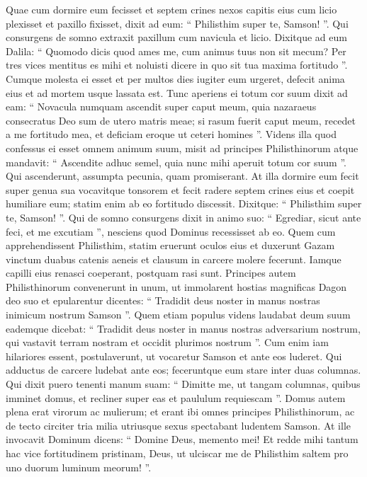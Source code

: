 \begin{biblechapter}
\begin{biblechapter}
\begin{biblechapter}
\begin{biblechapter}
\begin{biblechapter}
\begin{biblechapter}
\begin{biblechapter}
\begin{biblechapter}
\begin{biblechapter}
\begin{biblechapter}
\begin{biblechapter}
\begin{biblechapter}
\begin{biblechapter}
\begin{biblechapter}
\begin{biblechapter}
\begin{biblechapter}
\verse Quae cum dormire eum fecisset et septem crines nexos capitis eius cum licio plexisset et paxillo fixisset, dixit ad eum: “ Philisthim super te, Samson! ”. Qui consurgens de somno extraxit paxillum cum navicula et licio.
 \verse Dixitque ad eum Dalila: “ Quomodo dicis quod ames me, cum animus tuus non sit mecum? Per tres vices mentitus es mihi et noluisti dicere in quo sit tua maxima fortitudo ”. 
\verse Cumque molesta ei esset et per multos dies iugiter eum urgeret, defecit anima eius et ad mortem usque lassata est. 
\verse Tunc aperiens ei totum cor suum dixit ad eam: “ Novacula numquam ascendit super caput meum, quia nazaraeus consecratus Deo sum de utero matris meae; si rasum fuerit caput meum, recedet a me fortitudo mea, et deficiam eroque ut ceteri homines ”.
 \verse Videns illa quod confessus ei esset omnem animum suum, misit ad principes Philisthinorum atque mandavit: “ Ascendite adhuc semel, quia nunc mihi aperuit totum cor suum ”. Qui ascenderunt, assumpta pecunia, quam promiserant. 
\verse At illa dormire eum fecit super genua sua vocavitque tonsorem et fecit radere septem crines eius et coepit humiliare eum; statim enim ab eo fortitudo discessit. 
\verse Dixitque: “ Philisthim super te, Samson! ”. Qui de somno consurgens dixit in animo suo: “ Egrediar, sicut ante feci, et me excutiam ”, nesciens quod Dominus recessisset ab eo. 
\verse Quem cum apprehendissent Philisthim, statim eruerunt oculos eius et duxerunt Gazam vinctum duabus catenis aeneis et clausum in carcere molere fecerunt.
 \verse Iamque capilli eius renasci coeperant, postquam rasi sunt. 
\verse Principes autem Philisthinorum convenerunt in unum, ut immolarent hostias magnificas Dagon deo suo et epularentur dicentes:
 “ Tradidit deus noster
 in manus nostras
 inimicum nostrum Samson ”.
 \verse Quem etiam populus videns laudabat deum suum eademque dicebat:
 “ Tradidit deus noster in manus nostras
 adversarium nostrum,
 qui vastavit terram nostram
 et occidit plurimos nostrum ”.
 \verse Cum enim iam hilariores essent, postulaverunt, ut vocaretur Samson et ante eos luderet. Qui adductus de carcere ludebat ante eos; feceruntque eum stare inter duas columnas. 
\verse Qui dixit puero tenenti manum suam: “ Dimitte me, ut tangam columnas, quibus imminet domus, et recliner super eas et paululum requiescam ”. 
\verse Domus autem plena erat virorum ac mulierum; et erant ibi omnes principes Philisthinorum, ac de tecto circiter tria milia utriusque sexus spectabant ludentem Samson. 
\verse At ille invocavit Dominum dicens: “ Domine Deus, memento mei! Et redde mihi tantum hac vice fortitudinem pristinam, Deus, ut ulciscar me de Philisthim saltem pro uno duorum luminum meorum! ”. 

\end{biblechapter}
\end{biblechapter}
\end{biblechapter}
\end{biblechapter}
\end{biblechapter}
\end{biblechapter}
\end{biblechapter}
\end{biblechapter}
\end{biblechapter}
\end{biblechapter}
\end{biblechapter}
\end{biblechapter}
\end{biblechapter}
\end{biblechapter}
\end{biblechapter}
\end{biblechapter}
